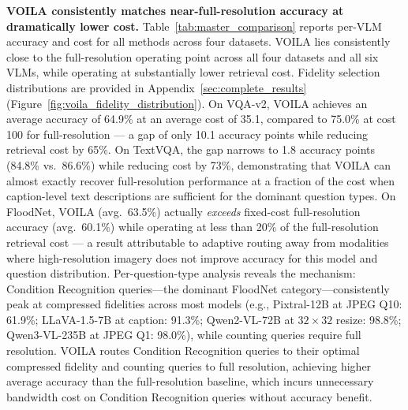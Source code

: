 \textbf{VOILA consistently matches near-full-resolution accuracy at dramatically lower cost.}
Table~\ref{tab:master_comparison} reports per-VLM accuracy and cost for all methods across four datasets.
\textsc{VOILA} lies consistently close to the full-resolution operating point across all four datasets and all six VLMs, while operating at substantially lower retrieval cost.
Fidelity selection distributions are provided in Appendix~\ref{sec:complete_results} (Figure~\ref{fig:voila_fidelity_distribution}).
On VQA-v2, \textsc{VOILA} achieves an average accuracy of 64.9\% at an average cost of 35.1, compared to 75.0\% at cost 100 for full-resolution --- a gap of only 10.1 accuracy points while reducing retrieval cost by 65\%.
On TextVQA, the gap narrows to 1.8 accuracy points (84.8\% vs.\ 86.6\%) while reducing cost by 73\%, demonstrating that \textsc{VOILA} can almost exactly recover full-resolution performance at a fraction of the cost when caption-level text descriptions are sufficient for the dominant question types.
On FloodNet, \textsc{VOILA} (avg.\ 63.5\%) actually \emph{exceeds} fixed-cost full-resolution accuracy (avg.\ 60.1\%) while operating at less than 20\% of the full-resolution retrieval cost --- a result attributable to adaptive routing away from modalities where high-resolution imagery does not improve accuracy for this model and question distribution.
Per-question-type analysis reveals the mechanism: Condition Recognition queries---the dominant FloodNet category---consistently peak at compressed fidelities across most models (e.g., Pixtral-12B at JPEG Q10: 61.9\%; LLaVA-1.5-7B at caption: 91.3\%; Qwen2-VL-72B at $32{\times}32$ resize: 98.8\%; Qwen3-VL-235B at JPEG Q1: 98.0\%), while counting queries require full resolution.
\textsc{VOILA} routes Condition Recognition queries to their optimal compressed fidelity and counting queries to full resolution, achieving higher average accuracy than the full-resolution baseline, which incurs unnecessary bandwidth cost on Condition Recognition queries without accuracy benefit.


